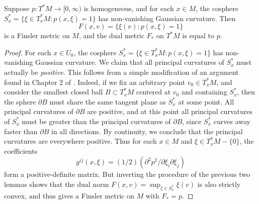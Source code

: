 \begin{lemma}
  Suppose $p: T^* M \to [0,\infty)$ is homogeneous, and for each $x \in M$, the cosphere $S_x^* = \{ \xi \in T_x^* M : p(x,\xi) = 1 \}$ has non-vanishing Gaussian curvature. Then
  \[ F(x,v) = \{ \xi(v) : p(x,\xi) = 1 \} \]
  is a Finsler metric on $M$, and the dual metric $F_*$ on $T^*M$ is equal to $p$.
\end{lemma}
\begin{proof}
  For each $x \in U_0$, the cosphere $S_x^* = \{ \xi \in T_x^* M : p(x,\xi) = 1 \}$ has non-vanishing Gaussian curvature. We claim that all principal curvatures of $S_x^*$ must actually be \emph{positive}. This follows from a simple modification of an argument found in Chapter 2 of \cite{HeinzHopf}. Indeed, if we fix an arbitrary point $v_0 \in T_x^*M$, and consider the smallest closed ball $B \subset T_x^* M$ centered at $v_0$ and containing $S_x^*$, then the sphere $\partial B$ must share the same tangent plane as $S_x^*$ at some point. All principal curvatures of $\partial B$ are positive, and at this point all principal curvatures of $S_x^*$ must be greater than the principal curvatures of $\partial B$, since $S_x^*$ curves away faster than $\partial B$ in all directions. By continuity, we conclude that the principal curvatures are everywhere positive.  Thus for each $x \in M$ and $\xi \in T_x^* M - \{ 0 \}$, the coefficients
  \begin{equation}
    g^{ij}(x,\xi) = (1/2) (\partial^2 p^2 / \partial \xi_i \partial \xi_j)
  \end{equation}
  form a positive-definite matrix. But inverting the procedure of the previous two lemmas shows that the dual norm $F(x,v) = \sup\nolimits_{\xi \in S_x^*} \xi(v)$ is also strictly convex, and thus gives a Finsler metric on $M$ with $F_* = p$. %
\end{proof}

%


